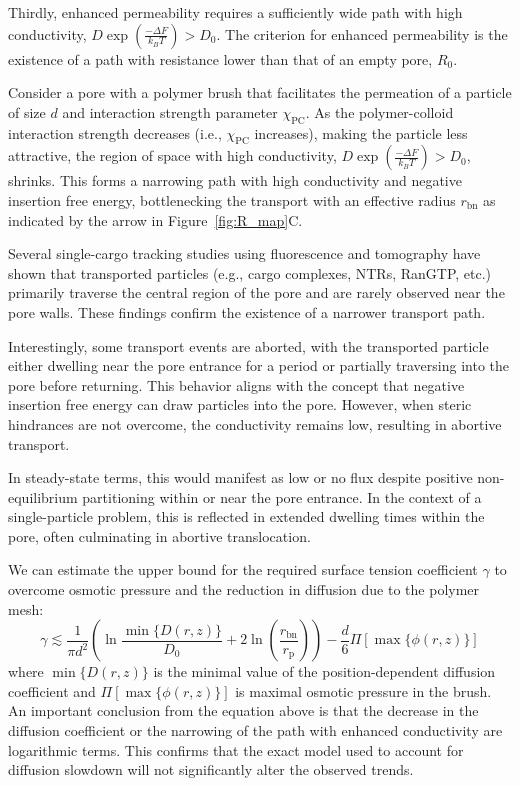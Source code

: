 \documentclass[12pt, a4paper]{article}
\begin{document}
Thirdly, enhanced permeability requires a sufficiently wide path with high conductivity, $D\exp\left(\frac{-\Delta F}{k_B T}\right) > D_0$.
The criterion for enhanced permeability is the existence of a path with resistance lower than that of an empty pore, $R_{0}$.

Consider a pore with a polymer brush that facilitates the permeation of a particle of size $d$ and interaction strength parameter $\chi_{\text{PC}}$.
As the polymer-colloid interaction strength decreases (i.e., $\chi_{\text{PC}}$ increases), making the particle less attractive, the region of space with high conductivity, $D\exp\left(\frac{-\Delta F}{k_B T}\right) > D_0$, shrinks.
This forms a narrowing path with high conductivity and negative insertion free energy, bottlenecking the transport with an effective radius $r_{\text{bn}}$ as indicated by the arrow in Figure~\ref{fig:R_map}C.

Several single-cargo tracking studies using fluorescence \cite{Musser2016, Lowe2010, Lowe2015, Yang2004, Kubitscheck2000, Ma2010} and tomography \cite{Beck2007} have shown that transported particles (e.g., cargo complexes, NTRs, RanGTP, etc.) primarily traverse the central region of the pore and are rarely observed near the pore walls. These findings confirm the existence of a narrower transport path. 

Interestingly, some transport events are aborted, with the transported particle either dwelling near the pore entrance for a period or partially traversing into the pore before returning. This behavior aligns with the concept that negative insertion free energy can draw particles into the pore. However, when steric hindrances are not overcome, the conductivity remains low, resulting in abortive transport.

In steady-state terms, this would manifest as low or no flux despite positive non-equilibrium partitioning within or near the pore entrance. In the context of a single-particle problem, this is reflected in extended dwelling times within the pore, often culminating in abortive translocation.

We can estimate the upper bound for the required surface tension coefficient $\gamma$ to overcome osmotic pressure and the reduction in diffusion due to the polymer mesh:
\begin{equation}
    \label{eq:gamma_crit}
    \gamma \lesssim \frac{1}{\pi d^2} \left( \ln\frac{\min\{D(r,z)\}}{D_0} + 2\ln\left( \frac{r_{\text{bn}}}{r_{\text{p}}} \right) \right) - \frac{d}{6}\Pi\left[\max\{\phi(r,z)\}\right]
\end{equation}
where $\min\{D(r,z)\}$ is the minimal value of the position-dependent diffusion coefficient and $\Pi\left[\max\{\phi(r,z)\}\right]$ is maximal osmotic pressure in the brush.
An important conclusion from the equation above is that the decrease in the diffusion coefficient or the narrowing of the path with enhanced conductivity are logarithmic terms.
This confirms that the exact model used to account for diffusion slowdown will not significantly alter the observed trends.
\end{document}
